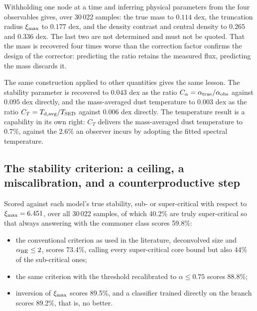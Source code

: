 \documentclass[11pt,a4paper]{article}
\begin{document}
Withholding one node at a time and inferring physical parameters from the four
observables gives, over 30\,022 samples: the true mass to $0.114$ dex, the
truncation radius $\xi_{\rm max}$ to $0.177$ dex, and the density contrast and
central density to $0.265$ and $0.336$ dex. The last two are not determined and
must not be quoted. That the mass is recovered four times worse than the
correction factor confirms the design of the corrector: predicting the ratio
retains the measured flux, predicting the mass discards it.

The same construction applied to other quantities gives the same lesson. The
stability parameter is recovered to $0.043$ dex as the ratio
$C_\alpha=\alpha_{\rm true}/\alpha_{\rm obs}$ against $0.095$ dex directly, and
the mass-averaged dust temperature to $0.003$ dex as the ratio
$C_T=T_{\rm d,avg}/T_{\rm SED}$ against $0.006$ dex directly. The temperature
result is a capability in its own right: $C_T$ delivers the mass-averaged dust
temperature to 0.7\%, against the 2.6\% an observer incurs by adopting the
fitted spectral temperature. 

\subsection{The stability criterion: a ceiling, a miscalibration, and a
counterproductive step}
\label{sec:practice-stability}

Scored against each model's true stability, sub- or super-critical with respect
to $\xi_{\rm max}=6.451$, over all 30\,022 samples, of which 40.2\% are truly
super-critical so that always answering with the commoner class scores 59.8\%:

\begin{itemize}
\item the conventional criterion as used in the literature, deconvolved size
  and $\alpha_{\rm BE}\le2$, scores 73.4\%, calling every super-critical core
  bound but also 44\% of the sub-critical ones;
\item the same criterion with the threshold recalibrated to $\alpha\le0.75$
  scores 88.8\%;
\item inversion of $\xi_{\rm max}$ scores 89.5\%, and a classifier trained
  directly on the branch scores 89.2\%, that is, no better.
\end{itemize}
\end{document}
